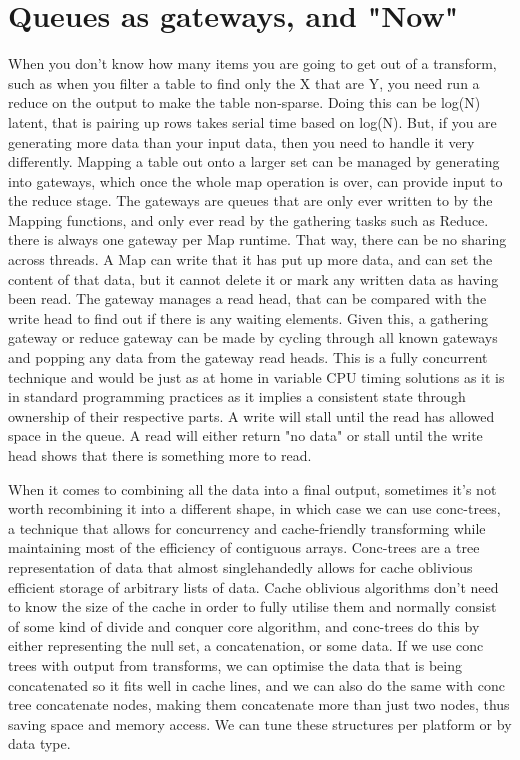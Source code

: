 \section[Gateways]{Queues as gateways, and "Now"}

When you don't know how many items you are going to get out of a transform,
such as when you filter a table to find only the X that are Y, you need run a
reduce on the output to make the table non-sparse. Doing this can be log(N)
latent, that is pairing up rows takes serial time based on log(N). But, if you
are generating more data than your input data, then you need to handle it very
differently. Mapping a table out onto a larger set can be managed by generating
into gateways, which once the whole map operation is over, can provide input to
the reduce stage. The gateways are queues that are only ever written to by the
Mapping functions, and only ever read by the gathering tasks such as Reduce.
there is always one gateway per Map runtime. That way, there can be no sharing
across threads. A Map can write that it has put up more data, and can set the
content of that data, but it cannot delete it or mark any written data as
having been read. The gateway manages a read head, that can be compared with
the write head to find out if there is any waiting elements. Given this, a
gathering gateway or reduce gateway can be made by cycling through all known
gateways and popping any data from the gateway read heads. This is a fully
concurrent technique and would be just as at home in variable CPU timing
solutions as it is in standard programming practices as it implies a consistent
state through ownership of their respective parts. A write will stall until the
read has allowed space in the queue. A read will either return "no data" or
stall until the write head shows that there is something more to read.

When it comes to combining all the data into a final output, sometimes it's not
worth recombining it into a different shape, in which case we can use
conc-trees, a technique that allows for concurrency and cache-friendly
transforming while maintaining most of the efficiency of contiguous arrays.
Conc-trees are a tree representation of data that almost singlehandedly allows
for cache oblivious efficient storage of arbitrary lists of data. Cache
oblivious algorithms don't need to know the size of the cache in order to fully
utilise them and normally consist of some kind of divide and conquer core
algorithm, and conc-trees do this by either representing the null set, a
concatenation, or some data. If we use conc trees with output from transforms,
we can optimise the data that is being concatenated so it fits well in cache
lines, and we can also do the same with conc tree concatenate nodes, making
them concatenate more than just two nodes, thus saving space and memory access.
We can tune these structures per platform or by data type.

